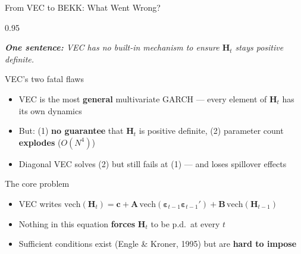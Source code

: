 \documentclass[9pt, aspectratio=169, t]{beamer}
\begin{document}
\begin{frame}{From VEC to BEKK: What Went Wrong?}
    \begin{cminipage}{0.95\textwidth}
    {\footnotesize
    \textit{\textbf{One sentence:} VEC has no built-in mechanism to ensure $\mathbf{H}_t$ stays positive definite.}
    \vspace{0.2cm}
    \begin{block}{VEC's two fatal flaws}
        \begin{itemize}\setlength{\itemsep}{2pt}
            \item VEC is the most \textbf{general} multivariate GARCH --- every element of $\mathbf{H}_t$ has its own dynamics
            \item But: (1) \textbf{no guarantee} that $\mathbf{H}_t$ is positive definite, (2) parameter count \textbf{explodes} ($O(N^4)$)
            \item Diagonal VEC solves (2) but still fails at (1) --- and loses spillover effects
        \end{itemize}
    \end{block}
    \vspace{0.1cm}
    \begin{alertblock}{The core problem}
        \begin{itemize}\setlength{\itemsep}{2pt}
            \item VEC writes $\text{vech}(\mathbf{H}_t) = \mathbf{c} + \mathbf{A}\,\text{vech}(\boldsymbol{\varepsilon}_{t-1}\boldsymbol{\varepsilon}_{t-1}') + \mathbf{B}\,\text{vech}(\mathbf{H}_{t-1})$
            \item Nothing in this equation \textbf{forces} $\mathbf{H}_t$ to be p.d.\ at every $t$
            \item Sufficient conditions exist (Engle \& Kroner, 1995) but are \textbf{hard to impose}
        \end{itemize}
    \end{alertblock}
    }
    \end{cminipage}
\end{frame}
\end{document}
